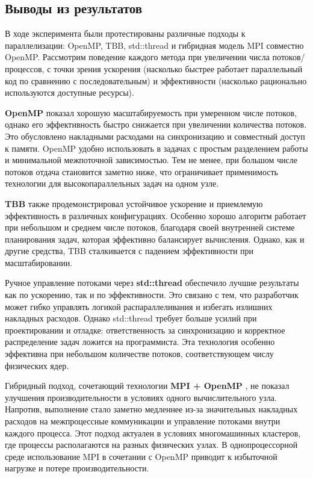 \documentclass[14pt, a4paper]{extarticle}
\begin{document}
\subsection{Выводы из результатов}
В ходе эксперимента были протестированы различные подходы к параллелизации: OpenMP, TBB, std::thread и гибридная модель MPI совместно OpenMP. Рассмотрим поведение каждого метода при увеличении числа потоков/процессов, с точки зрения ускорения (насколько быстрее работает параллельный код по сравнению с последовательным) и эффективности (насколько рационально используются доступные ресурсы).

\textbf{OpenMP} показал хорошую масштабируемость при умеренном числе потоков, однако его эффективность быстро снижается при увеличении количества потоков. Это обусловлено накладными расходами на синхронизацию и совместный доступ к памяти. OpenMP удобно использовать в задачах с простым разделением работы и минимальной межпоточной зависимостью. Тем не менее, при большом числе потоков отдача становится заметно ниже, что ограничивает применимость технологии для высокопараллельных задач на одном узле.

\textbf{TBB} также продемонстрировал устойчивое ускорение и приемлемую эффективность в различных конфигурациях. Особенно хорошо алгоритм работает при небольшом и среднем числе потоков, благодаря своей внутренней системе планирования задач, которая эффективно балансирует вычисления. Однако, как и другие средства, TBB сталкивается с падением эффективности при масштабировании.

Ручное управление потоками через \textbf{std::thread} обеспечило лучшие результаты как по ускорению, так и по эффективности. Это связано с тем, что разработчик может гибко управлять логикой распараллеливания и избегать излишних накладных расходов. Однако std::thread требует больше усилий при проектировании и отладке: ответственность за синхронизацию и корректное распределение задач ложится на программиста. Эта технология особенно эффективна при небольшом количестве потоков, соответствующем числу физических ядер.

Гибридный подход, сочетающий технологии \textbf{MPI + OpenMP} , не показал улучшения производительности в условиях одного вычислительного узла. Напротив, выполнение стало заметно медленнее из-за значительных накладных расходов на межпроцессные коммуникации и управление потоками внутри каждого процесса. Этот подход актуален в условиях многомашинных кластеров, где процессы располагаются на разных физических узлах. В однопроцессорной среде использование MPI в сочетании с OpenMP приводит к избыточной нагрузке и потере производительности.
\end{document}
